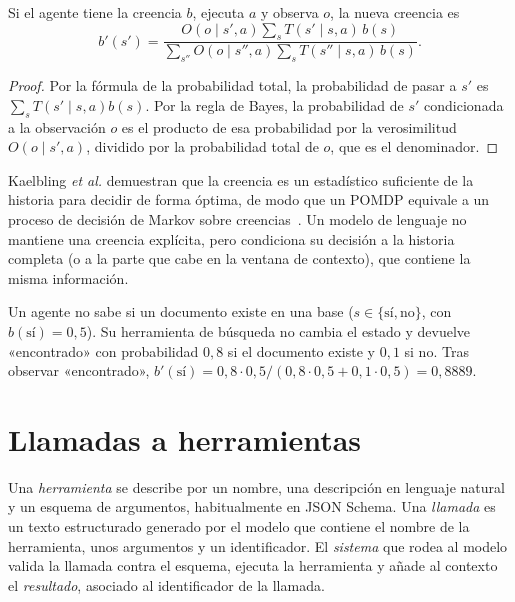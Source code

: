 \begin{proposicion}\label{prop:creencia}
Si el agente tiene la creencia $b$, ejecuta $a$ y observa $o$, la nueva creencia es
\[
b'(s')=\frac{O(o\mid s',a)\sum_{s}T(s'\mid s,a)\,b(s)}{\sum_{s''}O(o\mid s'',a)\sum_{s}T(s''\mid s,a)\,b(s)} .
\]
\end{proposicion}

\begin{proof}
Por la fórmula de la probabilidad total, la probabilidad de pasar a $s'$ es $\sum_s T(s'\mid s,a)b(s)$. Por la regla de Bayes, la probabilidad de $s'$ condicionada a la observación $o$ es el producto de esa probabilidad por la verosimilitud $O(o\mid s',a)$, dividido por la probabilidad total de $o$, que es el denominador.
\end{proof}

Kaelbling \emph{et al.} demuestran que la creencia es un estadístico suficiente de la historia para decidir de forma óptima, de modo que un POMDP equivale a un proceso de decisión de Markov sobre creencias~\cite{kaelbling}. Un modelo de lenguaje no mantiene una creencia explícita, pero condiciona su decisión a la historia completa (o a la parte que cabe en la ventana de contexto), que contiene la misma información.

\begin{ejemplo}\label{ej:creencia}
Un agente no sabe si un documento existe en una base ($s\in\{\text{sí},\text{no}\}$, con $b(\text{sí})=0{,}5$). Su herramienta de búsqueda no cambia el estado y devuelve «encontrado» con probabilidad $0{,}8$ si el documento existe y $0{,}1$ si no. Tras observar «encontrado», $b'(\text{sí})=0{,}8\cdot 0{,}5/(0{,}8\cdot 0{,}5+0{,}1\cdot 0{,}5)=0{,}8889$.
\end{ejemplo}

\section{Llamadas a herramientas}

\begin{definicion}\label{def:herramienta}
Una \emph{herramienta} se describe por un nombre, una descripción en lenguaje natural y un esquema de argumentos, habitualmente en JSON Schema. Una \emph{llamada} es un texto estructurado generado por el modelo que contiene el nombre de la herramienta, unos argumentos y un identificador. El \emph{sistema} que rodea al modelo valida la llamada contra el esquema, ejecuta la herramienta y añade al contexto el \emph{resultado}, asociado al identificador de la llamada.
\end{definicion}


